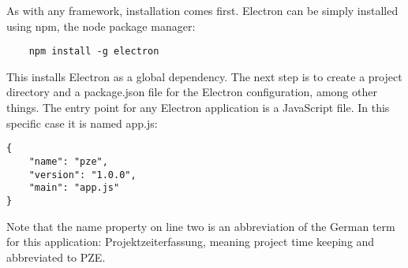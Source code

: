 As with any framework, installation comes first.
Electron can be simply installed using npm, the node package manager: \parencite{npm}
\begin{lstlisting}
    npm install -g electron
\end{lstlisting}
This installs Electron as a global dependency. 
The next step is to create a project directory and a package.json file for the Electron configuration, among other things. 
The entry point for any Electron application is a JavaScript file. 
In this specific case it is named app.js:
\begin{lstlisting}
{
    "name": "pze",
    "version": "1.0.0",
    "main": "app.js"
}
\end{lstlisting}
Note that the name property on line two is an abbreviation of the German term for this application:
Projektzeiterfassung, meaning project time keeping and abbreviated to PZE.
